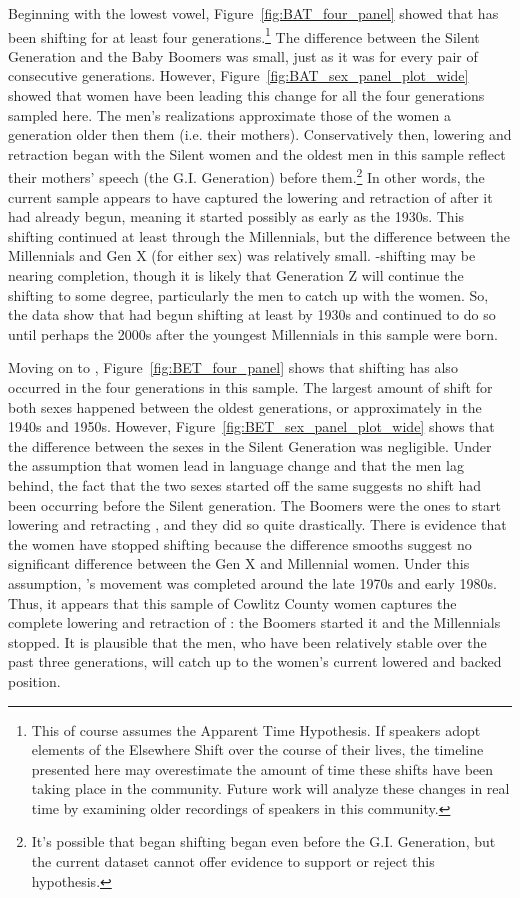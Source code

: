 Beginning with the lowest vowel, Figure~\ref{fig:BAT_four_panel} showed that \bat has been shifting for at least four generations.\footnote{This of course assumes the Apparent Time Hypothesis. If speakers adopt elements of the Elsewhere Shift over the course of their lives, the timeline presented here may overestimate the amount of time these shifts have been taking place in the community. Future work will analyze these changes in real time by examining older recordings of speakers in this community.} The difference between the Silent Generation and the Baby Boomers was small, just as it was for every pair of consecutive generations. However, Figure~\ref{fig:BAT_sex_panel_plot_wide} showed that women have been leading this change for all the four generations sampled here. The men's realizations approximate those of the women a generation older then them (i.e. their mothers). Conservatively then, \bat lowering and retraction began with the Silent women and the oldest men in this sample reflect their mothers' speech (the G.I. Generation) before them.\footnote{It's possible that \bat began shifting began even before the G.I. Generation, but the current dataset cannot offer evidence to support or reject this hypothesis.} In other words, the current sample appears to have captured the lowering and retraction of \bat after it had already begun, meaning it started possibly as early as the 1930s. This shifting continued at least through the Millennials, but the difference between the Millennials and Gen X (for either sex) was relatively small. \bat-shifting may be nearing completion, though it is likely that Generation Z will continue the shifting to some degree, particularly the men to catch up with the women. So, the data show that \bat had begun shifting at least by 1930s and continued to do so until perhaps the 2000s after the youngest Millennials in this sample were born.

Moving on to \bet, Figure~\ref{fig:BET_four_panel} shows that shifting has also occurred in the four generations in this sample. The largest amount of shift for both sexes happened between the oldest generations, or approximately in the 1940s and 1950s. However, Figure~\ref{fig:BET_sex_panel_plot_wide} shows that the difference between the sexes in the Silent Generation was negligible. Under the assumption that women lead in language change and that the men lag behind, the fact that the two sexes started off the same suggests no shift had been occurring before the Silent generation. The Boomers were the ones to start lowering and retracting \bet, and they did so quite drastically. There is evidence that the women have stopped shifting because the difference smooths suggest no significant difference between the Gen X and Millennial women. Under this assumption, \bet's movement was completed around the late 1970s and early 1980s. Thus, it appears that this sample of Cowlitz County women captures the complete lowering and retraction of \bet: the Boomers started it and the Millennials stopped. It is plausible that the men, who have been relatively stable over the past three generations, will catch up to the women's current lowered and backed position.

